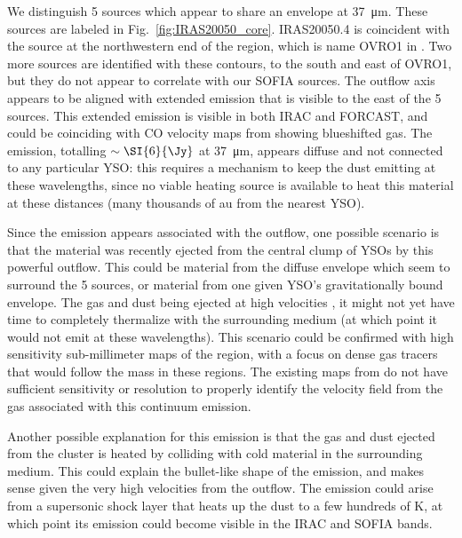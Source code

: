 We distinguish 5 sources which appear to share an envelope at \SI{37}{\um}. These sources are labeled in Fig.~\ref{fig:IRAS20050_core}. IRAS20050.4 is coincident with the source at the northwestern end of the region, which is name OVRO1 in \citet{Beltran:2008gu}. Two more sources are identified with these contours, to the south and east of OVRO1, but they do not appear to correlate with our SOFIA sources. The outflow axis \citep[Outflow "A",][]{Bachiller:1995cy} appears to be aligned with extended emission that is visible to the east of the 5 sources. This extended emission is visible in both IRAC and FORCAST, and could be coinciding with CO velocity maps from \citet{Beltran:2008gu} showing blueshifted gas. The emission, totalling $\sim\SI{6}{\Jy}$ at \SI{37}{\um}, appears diffuse and not connected to any particular YSO: this requires a mechanism to keep the dust emitting at these wavelengths, since no viable heating source is available to heat this material at these distances (many thousands of au from the nearest YSO).

Since the emission appears associated with the outflow, one possible scenario is that  the material was recently ejected from the central clump of YSOs by this powerful outflow. This could be material from the diffuse envelope which seem to surround the 5 sources, or material from one given YSO's gravitationally bound envelope. The gas and dust being ejected at high velocities \citep{Bachiller:1995cy}, it might not yet have time to completely thermalize with the surrounding medium (at which point it would not emit at these wavelengths). This scenario could be confirmed with high sensitivity sub-millimeter maps of the region, with a focus on dense gas tracers that would follow the mass in these regions. The existing maps from \citet{Beltran:2008gu} do not have sufficient sensitivity or resolution to properly identify the velocity field from the gas associated with this continuum emission.

Another possible explanation for this emission is that the gas and dust ejected from the cluster is heated by colliding with cold material in the surrounding medium. This could explain the bullet-like shape of the emission, and makes sense given the very high velocities from the outflow. The emission could arise from a supersonic shock layer that heats up the dust to a few hundreds of K, at which point its emission could become visible in the IRAC and SOFIA bands. 

